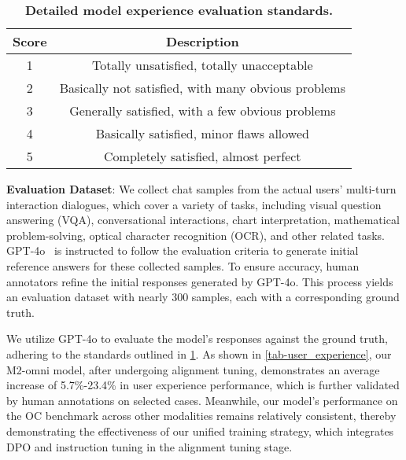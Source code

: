 \begin{table}[t]
\centering
\caption{
\textbf{Detailed model experience evaluation standards.}
}
\setlength{\tabcolsep}{4pt}
\begin{tabular}{c|c}
\toprule
Score & Description\\
\midrule
1 & Totally unsatisfied, totally unacceptable \\
2 & Basically not satisfied, with many obvious problems \\
3 & Generally satisfied, with a few obvious problems \\
4 & Basically satisfied, minor flaws allowed \\
5 & Completely satisfied, almost perfect \\
\bottomrule
\end{tabular}
\label{tab-model_expr_standards}
\end{table}

\textbf{Evaluation Dataset}: We collect chat samples from the actual users' multi-turn interaction dialogues, which cover a variety of tasks, including visual question answering (VQA), conversational interactions, chart interpretation, mathematical problem-solving, optical character recognition (OCR), and other related tasks. GPT-4o~\cite{openai2024gpt4ocard} is instructed to follow the evaluation criteria to generate initial reference answers for these collected samples. To ensure accuracy, human annotators refine the initial responses generated by GPT-4o. This process yields an evaluation dataset with nearly 300 samples, each with a corresponding ground truth.

We utilize GPT-4o to evaluate the model's responses against the ground truth, adhering to the standards outlined in  \cref{tab-model_expr_standards}.  As shown in \cref{tab-user_experience},  our M2-omni model, after undergoing  alignment tuning,  demonstrates an average increase of 5.7\%-23.4\% in user experience performance, which is further validated by human annotations on selected cases. Meanwhile, our model's performance on the OC benchmark across other modalities remains relatively consistent, thereby demonstrating the effectiveness of our unified training strategy, which integrates DPO and instruction tuning in the alignment tuning stage.



